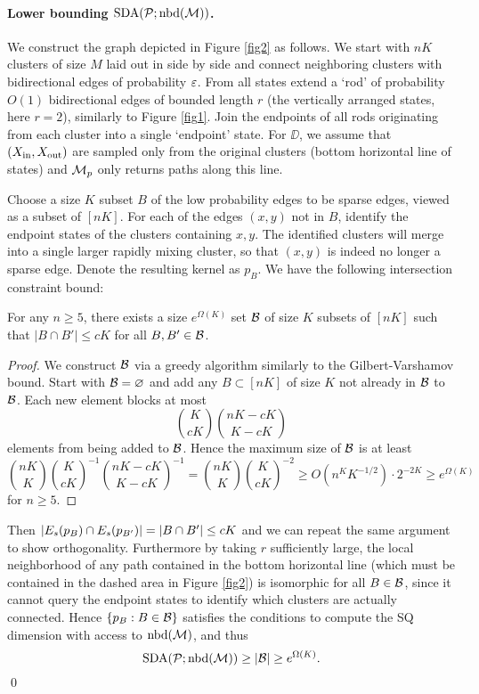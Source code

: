\paragraph{Lower bounding $\operatorname{SDA}(\mathcal{P};\operatorname{nbd}(\mathcal{M}))$.} We construct the graph depicted in Figure \ref{fig2} as follows. We start with $nK$ clusters of size $M$ laid out in side by side and connect neighboring clusters with bidirectional edges of probability $\varepsilon$. From all states extend a `rod' of probability $O(1)$ bidirectional edges of bounded length $r$ (the vertically arranged states, here $r=2$), similarly to Figure \ref{fig1}. Join the endpoints of all rods originating from each cluster into a single `endpoint' state. For $\DD$, we assume that $(X_{\operatorname{in}},X_{\operatorname{out}})$ are sampled only from the original clusters (bottom horizontal line of states) and $\mathcal{M}_p$ only returns paths along this line.

Choose a size $K$ subset $B$ of the low probability edges to be sparse edges, viewed as a subset of $[nK]$. For each of the edges $(x,y)$ not in $B$, identify the endpoint states of the clusters containing $x,y$. The identified clusters will merge into a single larger rapidly mixing cluster, so that $(x,y)$ is indeed no longer a sparse edge. Denote the resulting kernel as $p_B$. We have the following intersection constraint bound:
\begin{lemma}
For any $n\ge 5$, there exists a size $e^{\Omega(K)}$ set $\mathcal{B}$ of size $K$ subsets of $[nK]$ such that $|B\cap B'|\le cK$ for all $B,B'\in\mathcal{B}$.
\end{lemma}

\begin{proof}
We construct $\mathcal{B}$ via a greedy algorithm similarly to the Gilbert-Varshamov bound. Start with $\mathcal{B}=\varnothing$ and add any $B\subset[nK]$ of size $K$ not already in $\mathcal{B}$ to $\mathcal{B}$. Each new element blocks at most
\begin{equation*}
\binom{K}{cK}\binom{nK-cK}{K-cK}
\end{equation*}
elements from being added to $\mathcal{B}$. Hence the maximum size of $\mathcal{B}$ is at least
\begin{equation*}
\binom{nK}{K} \binom{K}{cK}^{-1} \binom{nK-cK}{K-cK}^{-1} = \binom{nK}{K} \binom{K}{cK}^{-2} \ge O(n^K K^{-1/2})\cdot 2^{-2K} \ge e^{\Omega(K)}
\end{equation*}
for $n\ge 5$.
\end{proof}
Then $\left\lvert E_s(p_B) \cap E_s(p_{B'})\right\rvert = |B\cap B'| \le cK$ and we can repeat the same argument to show orthogonality. Furthermore by taking $r$ sufficiently large, the local neighborhood of any path contained in the bottom horizontal line (which must be contained in the dashed area in Figure \ref{fig2}) is isomorphic for all $B\in\mathcal{B}$, since it cannot query the endpoint states to identify which clusters are actually connected. Hence $\{p_B:B\in\mathcal{B}\}$ satisfies the conditions to compute the SQ
dimension with access to $\operatorname{nbd}(\mathcal{M})$, and thus
\begin{equation*}
\operatorname{SDA}(\mathcal{P};\operatorname{nbd}(\mathcal{M})) \ge |\mathcal{B}| \ge e^{\Omega(K)}.
\end{equation*}
\qed
